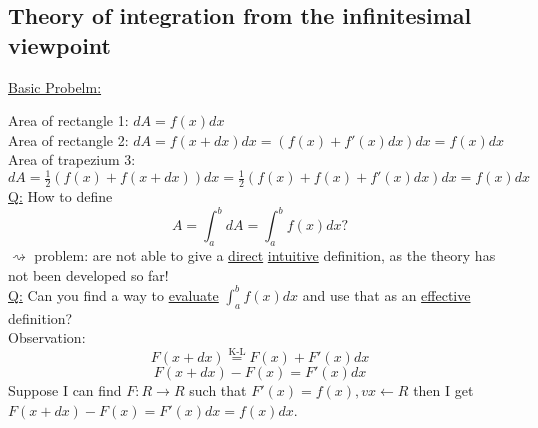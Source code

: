 \documentclass[a4paper, 12pt]{article}
\begin{document}
\subsection{Theory of integration from the infinitesimal viewpoint}
\underline{Basic Probelm:}
\begin{center}
\end{center}
Area of rectangle 1: $dA = f(x)dx$\\
Area of rectangle 2: $dA = f(x+dx)dx = (f(x) + f'(x)dx)dx = f(x)dx$\\
Area of trapezium 3: $dA = \frac{1}{2}(f(x) + f(x+dx))dx = \frac{1}{2}(f(x) + f(x) + f'(x)dx)dx = f(x)dx$\\
\underline{Q:} How to define\\
$$ A = \int_{a}^{b} dA = \int_{a}^{b} f(x)dx ?$$
$\rightsquigarrow$ problem: are not able to give a \underline{direct} \underline{intuitive} definition, as the theory has not been developed so far!\\
\underline{Q:} Can you find a way to \underline{evaluate} $ \int_{a}^{b} f(x)dx $ and use that as an \underline{effective} definition?\\
Observation:\\
$$ F(x+dx) \overset{\text{K-L}}{=} F(x) + F'(x)dx $$
$$ F(x+dx) - F(x) = F'(x)dx$$
Suppose I can find $F:R \rightarrow R$ such that $ F'(x) = f(x), vx \leftarrow R$ then I get $ F(x+dx) - F(x) = F'(x)dx = f(x)dx$.
\end{document}

